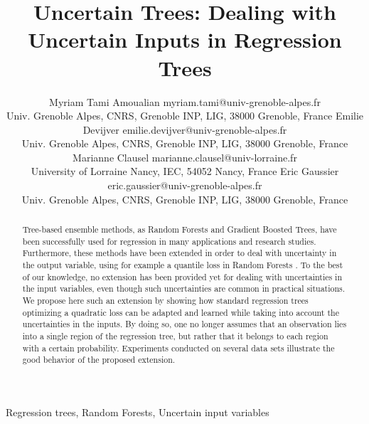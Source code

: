 \documentclass[twoside,11pt]{article}
\begin{document}
\title{Uncertain Trees: Dealing with Uncertain Inputs in Regression Trees}

\author{\name Myriam Tami Amoualian \email myriam.tami@univ-grenoble-alpes.fr\\
       \addr Univ. Grenoble Alpes, CNRS, Grenoble INP, LIG, 38000 Grenoble, France
       \AND
       \name Emilie Devijver \email emilie.devijver@univ-grenoble-alpes.fr\\
       \addr Univ. Grenoble Alpes, CNRS, Grenoble INP, LIG, 38000 Grenoble, France
       \AND
       \name Marianne Clausel \email marianne.clausel@univ-lorraine.fr\\
       \addr University of Lorraine Nancy, IEC, 54052 Nancy, France
       \AND
       \name Eric Gaussier \email eric.gaussier@univ-grenoble-alpes.fr\\
       \addr Univ. Grenoble Alpes, CNRS, Grenoble INP, LIG, 38000 Grenoble, France
       }

\editor{}

\maketitle

\begin{abstract}
Tree-based ensemble methods, as Random Forests and Gradient Boosted Trees, have been successfully used for regression in many applications and research studies. Furthermore, these methods have been extended in order to deal with uncertainty in the output variable, using for example a quantile loss in Random Forests \cite{meinshausen2006quantile}. To the best of our knowledge, no extension has been provided yet for dealing with uncertainties in the input variables, even though such uncertainties are common in practical situations. We propose here such an extension by showing how standard regression trees optimizing a quadratic loss can be adapted and learned while taking into account the uncertainties in the inputs. By doing  so, one no longer assumes that an observation lies into a single region of the regression tree, but rather that it belongs to each region with a certain probability. Experiments conducted on several data sets illustrate the good behavior of the proposed extension.
\end{abstract}

\begin{keywords}
Regression trees, Random Forests, Uncertain input variables
\end{keywords}







\vskip 0.2in


\end{document}
